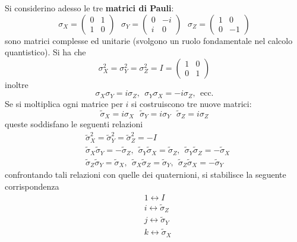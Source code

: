 \documentclass[10pt, letterpaper]{report}
\begin{document}
\noindent
Si considerino adesso le tre \textbf{matrici di Pauli}:\begin{equation}
    \sigma_X=\begin{pmatrix}
        0&1\\1&0
    \end{pmatrix} \ \ \ 
    \sigma_Y=\begin{pmatrix}
        0&-i\\i&0
    \end{pmatrix} \ \ \ 
    \sigma_Z=\begin{pmatrix}
        1&0\\0&-1
    \end{pmatrix} 
\end{equation}
sono matrici complesse ed unitarie (svolgono un ruolo fondamentale nel calcolo quantistico). Si ha che\begin{equation}
    \sigma_X^2=\sigma_Y^2=\sigma_Z^2=I=\begin{pmatrix}
        1&0\\0&1
    \end{pmatrix}
\end{equation}
inoltre\begin{equation}
    \sigma_X\sigma_Y=i\sigma_Z, \ \  \sigma_Y\sigma_X=-i\sigma_Z, \ \ \text{ecc.}
\end{equation}
Se si moltiplica ogni matrice per $i$ si costruiscono tre nuove matrici:\begin{equation}
\tilde\sigma_X=i\sigma_X \ \ \ 
    \tilde\sigma_Y=i\sigma_Y \ \ \ 
    \tilde\sigma_Z=i\sigma_Z
\end{equation}
queste soddisfano le seguenti relazioni\begin{align}
    &\tilde\sigma_X^2=\tilde\sigma_Y^2=\tilde\sigma_Z^2=-I\\
    &\tilde\sigma_X\tilde\sigma_Y=-\tilde\sigma_Z, \ \ \tilde\sigma_Y\tilde\sigma_X=\tilde\sigma_Z, \ \  
    \tilde\sigma_Y\tilde\sigma_Z=-\tilde\sigma_X \\ 
    & \tilde\sigma_Z\tilde\sigma_Y=\tilde\sigma_X, \ \ \tilde\sigma_X\tilde\sigma_Z=\tilde\sigma_Y, \ \  
    \tilde\sigma_Z\tilde\sigma_X=-\tilde\sigma_Y
\end{align}
confrontando tali relazioni con quelle dei quaternioni, si stabilisce la seguente corrispondenza\begin{align}
    &1\leftrightarrow I\\ 
    &i\leftrightarrow \tilde\sigma_Z\\
    &j\leftrightarrow \tilde\sigma_Y\\
    &k\leftrightarrow \tilde\sigma_X
\end{align}
\end{document}
